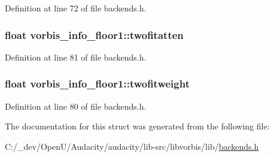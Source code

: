 Definition at line 72 of file backends.\+h.

\subsubsection[{\texorpdfstring{twofitatten}{twofitatten}}]{\setlength{\rightskip}{0pt plus 5cm}float vorbis\+\_\+info\+\_\+floor1\+::twofitatten}\hypertarget{structvorbis__info__floor1_a368b3ba743a9ab96206e938ec47102ee}{}\label{structvorbis__info__floor1_a368b3ba743a9ab96206e938ec47102ee}


Definition at line 81 of file backends.\+h.

\subsubsection[{\texorpdfstring{twofitweight}{twofitweight}}]{\setlength{\rightskip}{0pt plus 5cm}float vorbis\+\_\+info\+\_\+floor1\+::twofitweight}\hypertarget{structvorbis__info__floor1_a410ac8aa925af6a6e367b5bb257fcc43}{}\label{structvorbis__info__floor1_a410ac8aa925af6a6e367b5bb257fcc43}


Definition at line 80 of file backends.\+h.



The documentation for this struct was generated from the following file\+:\begin{DoxyCompactItemize}
\item 
C\+:/\+\_\+dev/\+Open\+U/\+Audacity/audacity/lib-\/src/libvorbis/lib/\hyperlink{backends_8h}{backends.\+h}\end{DoxyCompactItemize}
